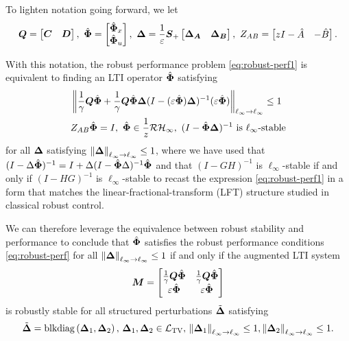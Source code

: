To lighten notation going forward, we let
\begin{equation}
\tf Q = \begin{bmatrix} \tf C & \tf D \end{bmatrix}, \ \Phih = \begin{bmatrix}\Phixh \\ \Phiuh \end{bmatrix}, \ \D = \frac{1}{\eps}\Sp\begin{bmatrix} \DA & \DB \end{bmatrix}, \ Z_{AB} = \begin{bmatrix} zI-\hat A & - \hat B\end{bmatrix}.
\end{equation}

With this notation, the robust performance problem \eqref{eq:robust-perf1} is equivalent to finding an LTI operator $\hat{\boldsymbol{\Phi}}$ satisfying
\begin{equation} \label{eq:robust-perf}
\begin{aligned}
& \left\|\frac{1}{\gamma}\boldsymbol{Q}\hat{\boldsymbol{\Phi}} + \frac{1}{\gamma}\boldsymbol{Q}\hat{\boldsymbol{\Phi}}{\boldsymbol{\Delta}}(I-(\varepsilon\hat{\boldsymbol{\Phi}}){\boldsymbol{\Delta}})^{-1}(\varepsilon\hat{\boldsymbol{\Phi}})\right\|_{\ell_\infty\to\ell_\infty} \leq 1 \\
& Z_{AB}\hat{\boldsymbol{\Phi}} = I,\ \hat{\boldsymbol{\Phi}} \in \frac{1}{z}\mathcal{RH}_\infty,\   (I-\hat{\boldsymbol{\Phi}}{\boldsymbol{\Delta}})^{-1} \text{ is $\ell_\infty$-stable}\\
\end{aligned}
\end{equation}
for all ${\boldsymbol{\Delta}}$ satisfying $\left\|{\boldsymbol{\Delta}}\right\|_{\ell_\infty\to\ell_\infty}\leq 1$, where we have used that $(I-\Delta\hat{\boldsymbol{\Phi}})^{-1} = I + \Delta(I-\hat{\boldsymbol{\Phi}}\Delta)^{-1}\hat{\boldsymbol{\Phi}}$ and that $(I-GH)^{-1}$ is $\ell_\infty$-stable if and only if $(I-HG)^{-1}$ is $\ell_\infty$-stable \cite{khammash1990stability} to recast the expression \eqref{eq:robust-perf1} in a form that matches the linear-fractional-transform (LFT) structure studied in classical robust control.

We can therefore leverage the equivalence between robust stability and performance \cite{khammash1990stability,dahleh1994control} to conclude that $\hat{\boldsymbol{\Phi}}$ satisfies the robust performance conditions \eqref{eq:robust-perf} for all $\left\|{\boldsymbol{\Delta}}\right\|_{\ell_\infty\to\ell_\infty}\leq 1$ if and only if the augmented LTI system
\begin{equation}
\boldsymbol{M} = \begin{bmatrix} \frac{1}{\gamma}\boldsymbol{Q}\hat{\boldsymbol{\Phi}} & \frac{1}{\gamma}\boldsymbol{Q}\hat{\boldsymbol{\Phi}} \\ \varepsilon\hat{\boldsymbol{\Phi}} & \varepsilon\hat{\boldsymbol{\Phi}} \end{bmatrix}
\label{eq:bigM}
\end{equation}
is robustly stable for all structured perturbations $\tilde{{\boldsymbol{\Delta}}}$ satisfying
\begin{equation}
\tilde{{\boldsymbol{\Delta}}} = \mathrm{blkdiag}\left({\boldsymbol{\Delta}}_1,{\boldsymbol{\Delta}}_2\right), \, {\boldsymbol{\Delta}}_1, {\boldsymbol{\Delta}}_2 \in \mathcal{L}_{\mathrm{TV}}, \,  \left\|{\boldsymbol{\Delta}}_1\right\|_{\ell_\infty\to\ell_\infty} \leq 1, \left\|{\boldsymbol{\Delta}}_2\right\|_{\ell_\infty\to\ell_\infty} \leq 1.
\end{equation}

